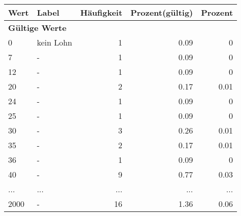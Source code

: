      \begin{longtable}{lXrrr}
     \toprule
     \textbf{Wert} & \textbf{Label} & \textbf{Häufigkeit} & \textbf{Prozent(gültig)} & \textbf{Prozent} \\
     \endhead
     \midrule
     \multicolumn{5}{l}{\textbf{Gültige Werte}}\\
        0 & \multicolumn{1}{X}{kein Lohn} & %
          \num{1} &
          \num[round-mode=places,round-precision=2]{0,09} &
          \num[round-mode=places,round-precision=2]{0} \\
        7 & \multicolumn{1}{X}{-} & %
          \num{1} &
          \num[round-mode=places,round-precision=2]{0,09} &
          \num[round-mode=places,round-precision=2]{0} \\
        12 & \multicolumn{1}{X}{-} & %
          \num{1} &
          \num[round-mode=places,round-precision=2]{0,09} &
          \num[round-mode=places,round-precision=2]{0} \\
        20 & \multicolumn{1}{X}{-} & %
          \num{2} &
          \num[round-mode=places,round-precision=2]{0,17} &
          \num[round-mode=places,round-precision=2]{0,01} \\
        24 & \multicolumn{1}{X}{-} & %
          \num{1} &
          \num[round-mode=places,round-precision=2]{0,09} &
          \num[round-mode=places,round-precision=2]{0} \\
        25 & \multicolumn{1}{X}{-} & %
          \num{1} &
          \num[round-mode=places,round-precision=2]{0,09} &
          \num[round-mode=places,round-precision=2]{0} \\
        30 & \multicolumn{1}{X}{-} & %
          \num{3} &
          \num[round-mode=places,round-precision=2]{0,26} &
          \num[round-mode=places,round-precision=2]{0,01} \\
        35 & \multicolumn{1}{X}{-} & %
          \num{2} &
          \num[round-mode=places,round-precision=2]{0,17} &
          \num[round-mode=places,round-precision=2]{0,01} \\
        36 & \multicolumn{1}{X}{-} & %
          \num{1} &
          \num[round-mode=places,round-precision=2]{0,09} &
          \num[round-mode=places,round-precision=2]{0} \\
        40 & \multicolumn{1}{X}{-} & %
          \num{9} &
          \num[round-mode=places,round-precision=2]{0,77} &
          \num[round-mode=places,round-precision=2]{0,03} \\
       ... & ... & ... & ... & ... \\
        2000 & \multicolumn{1}{X}{-} & %
          \num{16} &
          \num[round-mode=places,round-precision=2]{1,36} &
          \num[round-mode=places,round-precision=2]{0,06} \\


\end{longtable}
